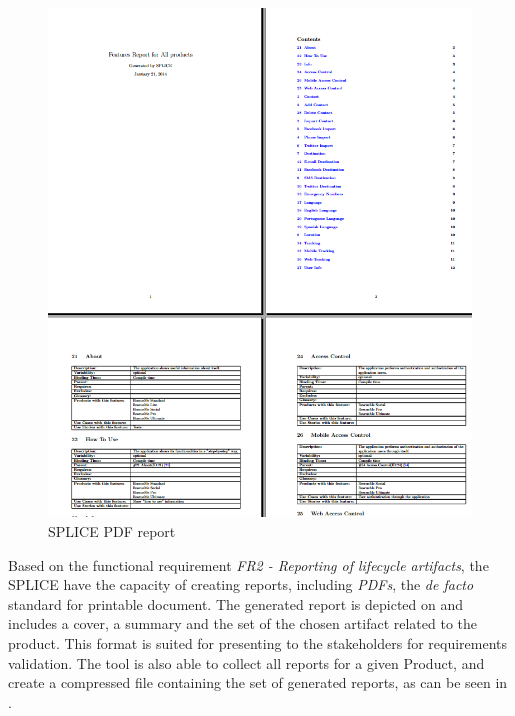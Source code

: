 \begin{figure}[htp]
\begin{center}
  \includegraphics[width=16cm]{chapters/proposed_solution/img/captures/report.PNG}
  \caption[SPLICE PDF report]{SPLICE PDF report }
  \label{fg:splice-reports}
\end{center}
\end{figure}




Based on the functional requirement \textit{FR2 - Reporting of lifecycle artifacts}, the \ac{SPLICE} have the capacity of creating reports, including \textit{PDFs}, the \textit{de facto} standard for printable document. The generated report is depicted on  and includes a cover, a summary and the set of the chosen artifact related to the product. This format is suited for presenting to the stakeholders for requirements validation. The tool is also able to collect all reports for a given Product, and create a compressed file containing the set of generated reports, as can be seen in . 








